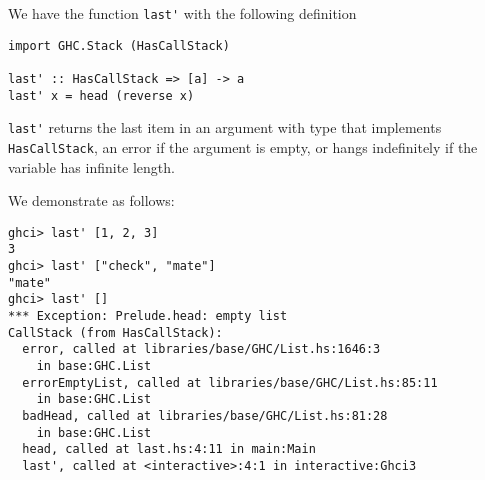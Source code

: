 
We have the function \verb|last'| with the following definition
\begin{verbatim}
import GHC.Stack (HasCallStack)

last' :: HasCallStack => [a] -> a 
last' x = head (reverse x)
\end{verbatim}
\verb|last'| returns the last item in an argument with type that implements 
\verb|HasCallStack|, an error if the argument is empty, or hangs indefinitely
if the variable has infinite length.\par
\qquad We demonstrate as follows:
\begin{verbatim}
ghci> last' [1, 2, 3]
3
ghci> last' ["check", "mate"]
"mate"
ghci> last' []
*** Exception: Prelude.head: empty list
CallStack (from HasCallStack):
  error, called at libraries/base/GHC/List.hs:1646:3 
    in base:GHC.List
  errorEmptyList, called at libraries/base/GHC/List.hs:85:11 
    in base:GHC.List
  badHead, called at libraries/base/GHC/List.hs:81:28 
    in base:GHC.List
  head, called at last.hs:4:11 in main:Main
  last', called at <interactive>:4:1 in interactive:Ghci3
\end{verbatim}
